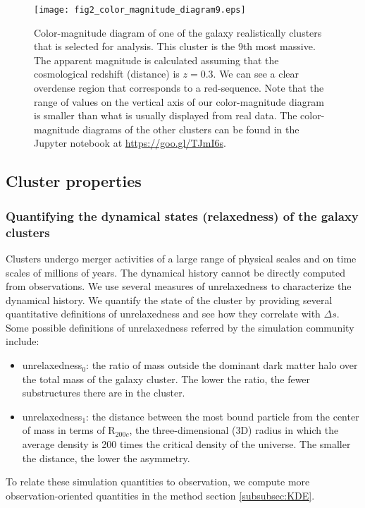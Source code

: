 \begin{figure}
	\centering
	\texttt{[image: fig2\_color\_magnitude\_diagram9.eps]}
	\caption{Color-magnitude diagram of one of the galaxy realistically clusters that is selected for 
		analysis. This cluster is the 9th most massive. 
		The apparent magnitude is calculated assuming that 
		the cosmological redshift (distance) is $z = 0.3$. 
		We can see a clear overdense region that corresponds to a red-sequence.
		Note that the range of values on the vertical axis of our color-magnitude diagram is  
		smaller than what is usually displayed from real data.  
		The color-magnitude diagrams of the other clusters can be found in the
		Jupyter notebook at \href{https://github.com/karenyyng/galaxy_DM_offset/blob/master/code/analyses/fig2_color_magnitude_diagram.ipynb}{https://goo.gl/TJmI6s}.
		\label{fig:color_magnitude_diagram}
	} 
\end{figure}

\subsection{Cluster properties}
\label{subsec:cluster_properties}

\subsubsection{Quantifying the dynamical states (relaxedness) of the galaxy clusters}
\label{subsubsec:relaxedness}

Clusters undergo merger activities of a large range of physical scales and 
on time scales of millions of years. 
The dynamical history cannot be directly 
computed from observations. We use several measures of unrelaxedness to characterize 
the dynamical history.
We quantify the state of the cluster by providing several quantitative
definitions of unrelaxedness and see how they correlate with $\Delta s$.
Some possible definitions of unrelaxedness referred by the simulation community
include:
\begin{itemize}
	\item unrelaxedness$_0$: the ratio of mass outside the dominant dark matter halo over the total mass
		of the galaxy cluster. The lower the ratio, the fewer substructures there
		are in the cluster. 
	\item unrelaxedness$_1$: the distance between the most bound particle from
		the center of mass in terms of R$_{200c}$, the three-dimensional (3D) radius in which the
		average density is 200 times the critical density of the universe. 
		The smaller the distance, the lower the asymmetry. 
\end{itemize}
To relate these simulation quantities to observation, 
we compute more observation-oriented 
quantities in the method section \ref{subsubsec:KDE}. 

